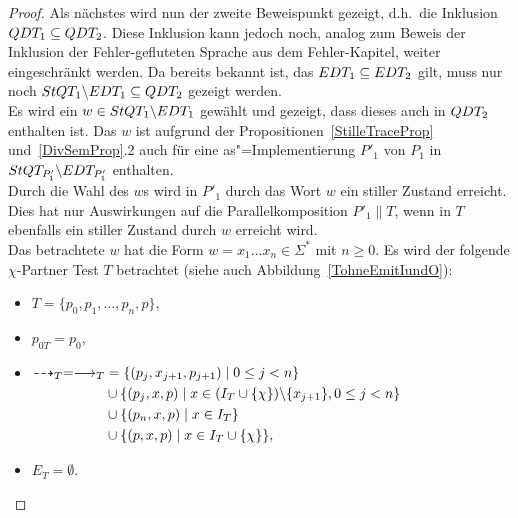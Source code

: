 \begin{proof}
  Als nächstes wird nun der zweite Beweispunkt gezeigt, d.h.\ die Inklusion
  $QDT _1\subseteq QDT _2$. Diese Inklusion kann jedoch noch, analog zum
  Beweis der Inklusion der Fehler-gefluteten Sprache aus dem Fehler-Kapitel,
  weiter eingeschränkt werden. Da bereits bekannt ist, das $EDT _1 \subseteq
  EDT _2$ gilt, muss nur noch $StQT _1\backslash EDT _1\subseteq QDT _2$
  gezeigt werden.\\
  Es wird ein $w\in StQT _1\backslash EDT _1$ gewählt und gezeigt, dass dieses
  auch in $QDT _2$ enthalten ist. Das $w$ ist aufgrund der
  Propositionen~\ref{StilleTraceProp} und~\ref{DivSemProp}.2 auch für eine
  as"=Implementierung $P'_1$ von $P_1$ in $StQT _{P'_1}\backslash EDT
  _{P'_1}$ enthalten.\\
  Durch die Wahl des $w$s wird in $P'_1$ durch das Wort $w$ ein stiller
  Zustand erreicht. Dies hat nur Auswirkungen auf die Parallelkomposition
  $P'_1\|T$, wenn in $T$ ebenfalls ein stiller Zustand durch $w$ erreicht
  wird.\\
  Das betrachtete $w$ hat die Form $w = x_1\dots x_n\in\Sigma ^*$ mit $n\geq
  0$. Es wird der folgende $\chi$-Partner Test $T$ betrachtet (siehe auch
  Abbildung~\ref{TohneEmitIundO}):
  \begin{itemize}
    \item $T=\{p_0,p_1,\dots ,p_n, p\}$,
    \item $p_{0T}=p_0$,
    \item $\begin{aligned}[t]
        \may _T = \must _T &= \{(p_j,x_{j+1},p_{j+1})\mid  0\leq j< n\}\\
        &\cup\{(p_j,x,p)\mid  x\in (I_T\cup \{\chi\})\backslash\{x_{j+1}\},
        0\leq j< n\}\\
        &\cup\{(p_n,x,p)\mid x\in I_T\}\\
        &\cup\{(p,x,p)\mid x\in I_T\cup\{\chi\}\},
    \end{aligned}$
    \item $E_T=\emptyset$.
  \end{itemize}
  \begin{figure} [h!tbp]
  \begin{center}
\end{center}
\end{figure}
\end{proof}
